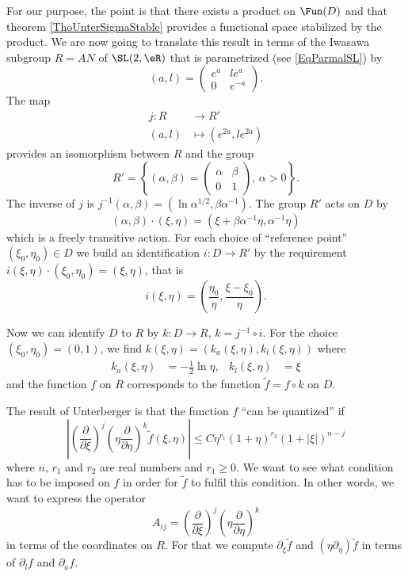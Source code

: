 For our purpose, the point is that there exists a product on $\Fun(D)$ and that theorem \ref{ThoUnterSigmaStable} provides a functional space stabilized by the product. We are now going to translate this result in terms of the Iwasawa subgroup $R=AN$ of $\SL(2,\eR)$ that is parametrized (see \eqref{EqParmalSL}) by
\[
  (a,l)=\begin{pmatrix}
 e^{a}&l e^{a}\\0& e^{-a}
\end{pmatrix}.
\]
 The map 
\begin{equation}
\begin{aligned}
 j\colon R&\to R' \\ 
(a,l)&\mapsto ( e^{2a},l e^{2a}) 
\end{aligned}
\end{equation}
provides an isomorphism between $R$ and the group
\[
  R'=\left\{ (\alpha,\beta)= \begin{pmatrix}
\alpha&\beta\\0&1
\end{pmatrix},\,\alpha>0 \right\}.
\]
The inverse of $j$ is  $j^{-1}(\alpha,\beta)=(\ln\alpha^{1/2},\beta\alpha^{-1})$.  The group $R'$ acts on $D$ by
\begin{equation}
(\alpha,\beta)\cdot(\xi,\eta)=(\xi+\beta\alpha^{-1}\eta,\alpha^{-1}\eta)
\end{equation}
which is a freely transitive action. For each choice of ``reference point'' $(\xi_0,\eta_0)\in D$ we  build an identification $i\colon D\to R'$ by the requirement $ i(\xi,\eta)\cdot(\xi_0,\eta_0)=(\xi,\eta)$, that is
\begin{equation}
i(\xi,\eta)=\left( \frac{ \eta_0 }{ \eta },\frac{ \xi-\xi_0 }{ \eta } \right).
\end{equation}

Now we can identify $D$ to $R$ by $k\colon D\to R$, $k=j^{-1}\circ i$. For the choice $(\xi_0,\eta_0)=(0,1)$, we find $k(\xi,\eta)=(k_a(\xi,\eta),k_l(\xi,\eta))$ where
\begin{align}\label{Eqkaklexp}
	k_a(\xi,\eta)&=-\frac{ 1 }{2}\ln\eta,
  &k_l(\xi,\eta)&=\xi
\end{align}
and the function $f$ on $R$ corresponds to the function $\tilde f=f\circ k$ on $D$.

The result of Unterberger is that the function $f$ ``can be quantized'' if
\begin{equation}  \label{eq_condeUnterD}
\left|  \left( \frac{ \partial }{ \partial\xi } \right)^j\left( \eta\frac{ \partial }{ \partial\eta } \right)^k  \tilde f(\xi,\eta)  \right|
\leq C\eta^{r_1}(1+\eta)^{r_2}(1+| \xi |)^{n-j}
\end{equation}
where $n$, $r_1$ and $r_2$ are real numbers and $r_1\geq0$. We want to see what condition has to be imposed on $f$  in order for $\tilde f$ to fulfil this condition. In other words, we want to express the operator
\[ 
  A_{ij}=\left( \frac{ \partial }{ \partial\xi } \right)^j\left( \eta\frac{ \partial }{ \partial\eta } \right)^k
\]
in terms of the coordinates on $R$. For that we compute $\partial_{\xi}\tilde f$ and $(\eta\partial_{\eta})\tilde f$ in terms of $\partial_lf$ and $\partial_af$. 



